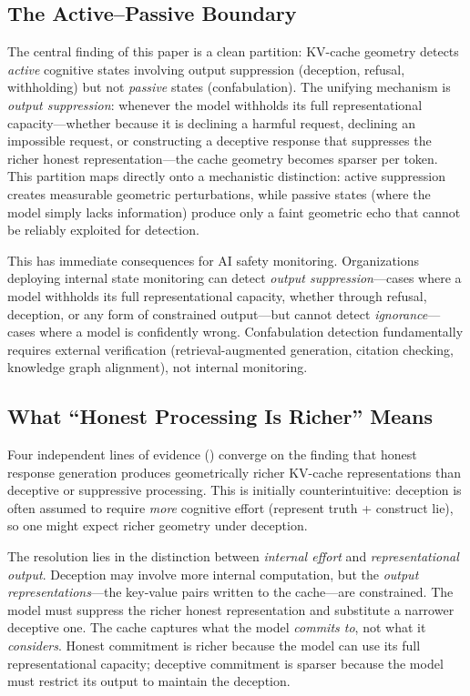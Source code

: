 \subsection{The Active--Passive Boundary}

The central finding of this paper is a clean partition: KV-cache geometry detects \emph{active} cognitive states involving output suppression (deception, refusal, withholding) but not \emph{passive} states (confabulation). The unifying mechanism is \emph{output suppression}: whenever the model withholds its full representational capacity---whether because it is declining a harmful request, declining an impossible request, or constructing a deceptive response that suppresses the richer honest representation---the cache geometry becomes sparser per token. This partition maps directly onto a mechanistic distinction: active suppression creates measurable geometric perturbations, while passive states (where the model simply lacks information) produce only a faint geometric echo that cannot be reliably exploited for detection.

This has immediate consequences for AI safety monitoring. Organizations deploying internal state monitoring can detect \emph{output suppression}---cases where a model withholds its full representational capacity, whether through refusal, deception, or any form of constrained output---but cannot detect \emph{ignorance}---cases where a model is confidently wrong. Confabulation detection fundamentally requires external verification (retrieval-augmented generation, citation checking, knowledge graph alignment), not internal monitoring.

\subsection{What ``Honest Processing Is Richer'' Means}

Four independent lines of evidence () converge on the finding that honest response generation produces geometrically richer KV-cache representations than deceptive or suppressive processing. This is initially counterintuitive: deception is often assumed to require \emph{more} cognitive effort (represent truth + construct lie), so one might expect richer geometry under deception.

The resolution lies in the distinction between \emph{internal effort} and \emph{representational output}. Deception may involve more internal computation, but the \emph{output representations}---the key-value pairs written to the cache---are constrained. The model must suppress the richer honest representation and substitute a narrower deceptive one. The cache captures what the model \emph{commits to}, not what it \emph{considers}. Honest commitment is richer because the model can use its full representational capacity; deceptive commitment is sparser because the model must restrict its output to maintain the deception.

